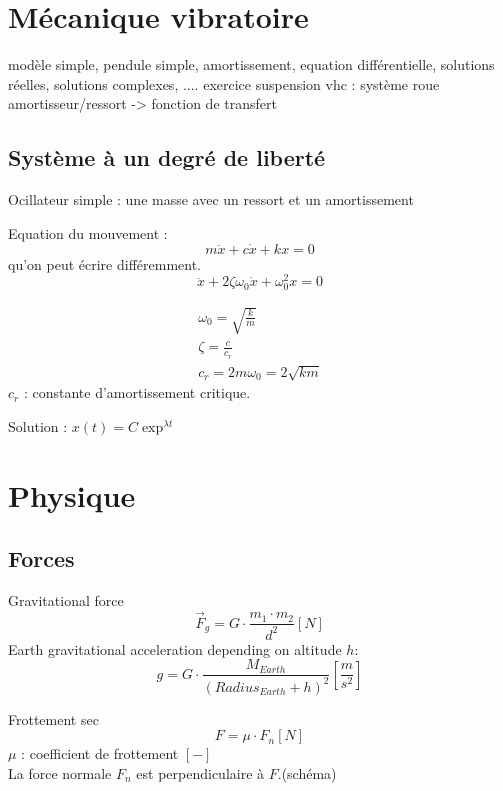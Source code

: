 	
	\newpage
	\section{Mécanique vibratoire}
	modèle simple, pendule simple, amortissement, equation différentielle, solutions réelles, solutions complexes, ....
	exercice suspension vhc : système roue amortisseur/ressort -> fonction de transfert
	
	\subsection{Système à un degré de liberté}
	
	Ocillateur simple : une masse avec un ressort et un amortissement
	
	Equation du mouvement :
	\begin{equation}
	m \ddot{x} + c \dot{x}+k x =0
	\end{equation}
	qu'on peut écrire différemment. 
	\begin{equation}
	\ddot{x} + 2\zeta \omega_0 \dot{x}+\omega_0^2  x =0
	\end{equation}
	
	\begin{eqnarray}
	\omega_0=\sqrt{\frac{k}{m}}\\
	\zeta=\frac{c}{c_r}\\
	c_r=2 m \omega_0=2\sqrt{km}
	\end{eqnarray}
	$c_r$ : constante d'amortissement critique. 
	
	Solution : $x(t)=C \exp^{\lambda t}$
	
	\newpage
	\section{Physique}
	\subsection{Forces}
	Gravitational force
	\begin{equation}
	\vec{F}_g=G\cdot \frac{m_1 \cdot m_2}{d^2} [N]
	\end{equation}
	Earth gravitational acceleration depending on altitude $h$: 
	\begin{equation}
	g=G\cdot \frac{M_{Earth}}{(Radius_{Earth}+h)^2}[\frac{m}{s^2}]
	\end{equation}
	
	Frottement sec
	\begin{equation}
	F=\mu \cdot F_n [N]
	\end{equation}
	$\mu$ : coefficient de frottement $[-]$\\
	La force normale $F_n$ est perpendiculaire à $F$.(schéma)\\
	
